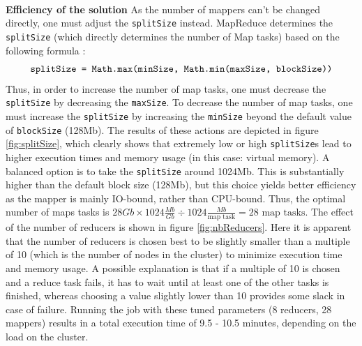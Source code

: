 \documentclass[11pt]{article}
\begin{document}
\noindent\\\textbf{Efficiency of the solution}
As the number of mappers can't be changed directly, one must adjust the \texttt{splitSize} instead. MapReduce determines the \texttt{splitSize} (which directly determines the number of Map tasks) based on the following formula \cite{Hadoop}:
\begin{equation*}
\texttt{\text{splitSize = Math.max(minSize, Math.min(maxSize, blockSize))}}
\end{equation*}
Thus, in order to increase the number of map tasks, one must decrease the \texttt{splitSize} by decreasing the \texttt{maxSize}. To decrease the number of map tasks, one must increase the \texttt{splitSize} by increasing the \texttt{minSize} beyond the default value of \texttt{blockSize} (128Mb). The results of these actions are depicted in figure \ref{fig:splitSize}, which clearly shows that extremely low or high \texttt{splitSize}s lead to higher execution times and memory usage (in this case: virtual memory). A balanced option is to take the \texttt{splitSize} around 1024Mb. This is substantially higher than the default block size (128Mb), but this choice yields better efficiency as the mapper is mainly IO-bound, rather than CPU-bound. Thus, the optimal number of maps tasks is $28Gb \times 1024 \frac{Mb}{Gb} \div 1024 \frac{Mb}{\text{map task}} = 28 \text{ map tasks}$. The effect of the number of reducers is shown in figure \ref{fig:nbReducers}. Here it is apparent that the number of reducers is chosen best to be slightly smaller than a multiple of 10 (which is the number of nodes in the cluster) to minimize execution time and memory usage. A possible explanation is that if a multiple of 10 is chosen and a reduce task fails, it has to wait until at least one of the other tasks is finished, whereas choosing a value slightly lower than 10 provides some slack in case of failure. Running the job with these tuned parameters (8 reducers, 28 mappers) results in a total execution time of 9.5 - 10.5 minutes, depending on the load on the cluster.
\end{document}
